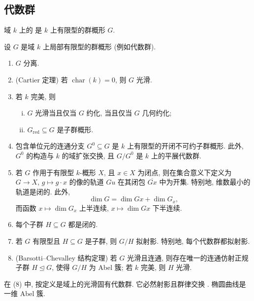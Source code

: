 \subsection{代数群}\label{src:B.1.2-subsection}
\begin{definition}\label{src:B.1.18}
域 $k$ 上的 是 $k$ 上有限型的群概形 $G$.
\end{definition}
\begin{proposition}\label{src:B.1.19}
设 $G$ 是域 $k$ 上局部有限型的群概形 (例如代数群).
\begin{enumerate}[(1)]
\item $G$ 分离.
\item (Cartier 定理) 若 $\operatorname{char}(k)=0$, 则 $G$ 光滑.
\item 若 $k$ 完美, 则
\begin{enumerate}[(i)]
\item $G$ 光滑当且仅当 $G$ 约化, 当且仅当 $G$ 几何约化;
\item $G_{\mathrm{red}}\subseteq G$ 是子群概形.
\end{enumerate}
\item 包含单位元的连通分支 $G^0\subseteq G$ 是 $k$ 上有限型的开闭不可约子群概形. 此外, $G^0$ 的构造与 $k$ 的域扩张交换, 且 $G/G^0$ 是 $k$ 上的平展代数群.
\item 若 $G$ 作用于有限型 $k$-概形 $X$, 且 $x\in X$ 为闭点, 则在集合意义下定义为 $G\to X$, $g\mapsto g\cdot x$ 的像的轨道 $Gu$ 在其闭包 $\overline{Gx}$ 中为开集. 特别地, 维数最小的轨道是闭的. 此外,
\[
\dim G=\dim Gx+\dim G_x,
\]
而函数 $x\mapsto\dim G_x$ 上半连续, $x\mapsto\dim Gx$ 下半连续.
\item 每个子群 $H\subseteq G$ 都是闭的.
\item 若 $G$ 有限型且 $H\subseteq G$ 是子群, 则 $G/H$ 拟射影. 特别地, 每个代数群都拟射影.
\item (Barsotti--Chevalley 结构定理) 若 $G$ 光滑且连通, 则存在唯一的连通仿射正规子群 $H\trianglelefteq G$, 使得 $G/H$ 为 Abel 簇; 若 $k$ 完美, 则 $H$ 光滑.
\end{enumerate}
在 (8) 中,  按定义是域上的光滑固有代数群. 它必然射影且群律交换 \cite[第 $39$, $59$ 页]{Mum70a}. 椭圆曲线是一维 Abel 簇.
\end{proposition}
